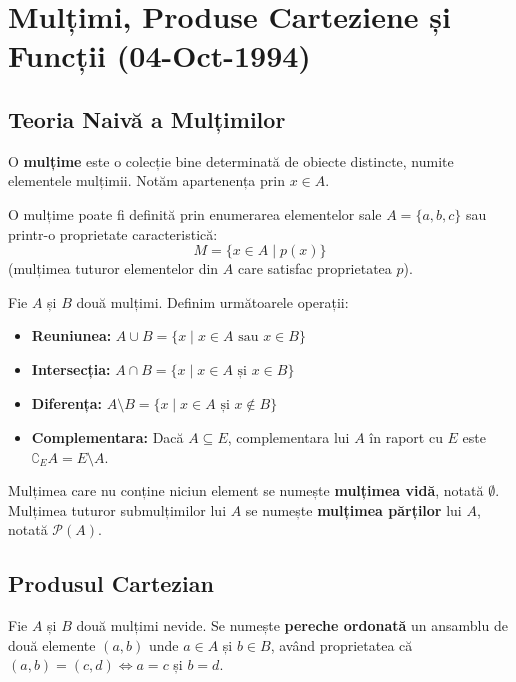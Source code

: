 \section{Mulțimi, Produse Carteziene și Funcții (04-Oct-1994)}

\subsection*{Teoria Naivă a Mulțimilor}

\begin{definition}
O \textbf{mulțime} este o colecție bine determinată de obiecte distincte, numite elementele mulțimii. Notăm apartenența prin $x \in A$.
\end{definition}

O mulțime poate fi definită prin enumerarea elementelor sale $A = \{a, b, c\}$ sau printr-o proprietate caracteristică:
$$ M = \{x \in A \mid p(x)\} $$
(mulțimea tuturor elementelor din $A$ care satisfac proprietatea $p$).

\begin{definition}\leavevmode
Fie $A$ și $B$ două mulțimi. Definim următoarele operații:
\begin{itemize}
    \item \textbf{Reuniunea:} $A \cup B = \{x \mid x \in A \text{ sau } x \in B\}$
    \item \textbf{Intersecția:} $A \cap B = \{x \mid x \in A \text{ și } x \in B\}$
    \item \textbf{Diferența:} $A \setminus B = \{x \mid x \in A \text{ și } x \notin B\}$
    \item \textbf{Complementara:} Dacă $A \subseteq E$, complementara lui $A$ în raport cu $E$ este $\complement_E A = E \setminus A$.
\end{itemize}
\end{definition}

\begin{remark}
Mulțimea care nu conține niciun element se numește \textbf{mulțimea vidă}, notată $\emptyset$. Mulțimea tuturor submulțimilor lui $A$ se numește \textbf{mulțimea părților} lui $A$, notată $\mathcal{P}(A)$.
\end{remark}

\subsection*{Produsul Cartezian}

\begin{definition}
Fie $A$ și $B$ două mulțimi nevide. Se numește \textbf{pereche ordonată} un ansamblu de două elemente $(a, b)$ unde $a \in A$ și $b \in B$, având proprietatea că $(a, b) = (c, d) \iff a = c$ și $b = d$.
\end{definition}

